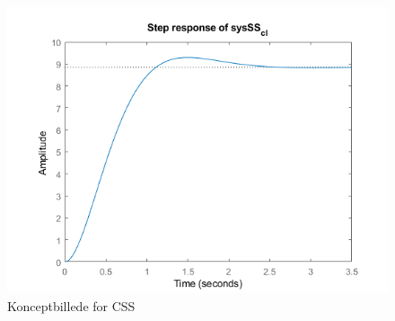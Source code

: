 \graphicspath{{Chapters/Pol-placering/}}
\begin{figure}[H]
	\centering
	\includegraphics[width = 400pt]{Img/StepOfSysSS_cl.png}
	\caption{Konceptbillede for CSS}
	\label{fig:konceptbillede}
\end{figure}